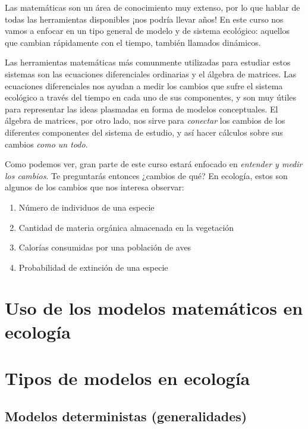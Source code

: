 \documentclass[
]{book}
\providecommand{\tightlist}{%
  \setlength{\itemsep}{0pt}\setlength{\parskip}{0pt}}
\begin{document}
Las matemáticas son un área de conocimiento muy extenso, por lo que hablar de todas las herramientas disponibles ¡nos podría llevar años! En este curso nos vamos a enfocar en un tipo general de modelo y de sistema ecológico: aquellos que cambian rápidamente con el tiempo, también llamados dinámicos.

Las herramientas matemáticas más comunmente utilizadas para estudiar estos sistemas son las ecuaciones diferenciales ordinarias y el álgebra de matrices. Las ecuaciones diferenciales nos ayudan a medir los cambios que sufre el sistema ecológico a través del tiempo en cada uno de sus componentes, y son muy útiles para representar las ideas plasmadas en forma de modelos conceptuales. El álgebra de matrices, por otro lado, nos sirve para \emph{conectar} los cambios de los diferentes componentes del sistema de estudio, y así hacer cálculos sobre sus cambios \emph{como un todo}.

Como podemos ver, gran parte de este curso estará enfocado en \emph{entender y medir los cambios}. Te preguntarás entonces ¿cambios de qué? En ecología, estos son algunos de los cambios que nos interesa observar:

\begin{enumerate}
\def\labelenumi{\arabic{enumi}.}
\tightlist
\item
  Número de individuos de una especie
\item
  Cantidad de materia orgánica almacenada en la vegetación
\item
  Calorías consumidas por una población de aves
\item
  Probabilidad de extinción de una especie
\end{enumerate}

\hypertarget{uso-de-los-modelos-matemuxe1ticos-en-ecologuxeda}{%
\section{Uso de los modelos matemáticos en ecología}\label{uso-de-los-modelos-matemuxe1ticos-en-ecologuxeda}}

\hypertarget{tipos-de-modelos-en-ecologuxeda}{%
\section{Tipos de modelos en ecología}\label{tipos-de-modelos-en-ecologuxeda}}

\hypertarget{modelos-deterministas-generalidades}{%
\subsection{Modelos deterministas (generalidades)}\label{modelos-deterministas-generalidades}}
\end{document}
